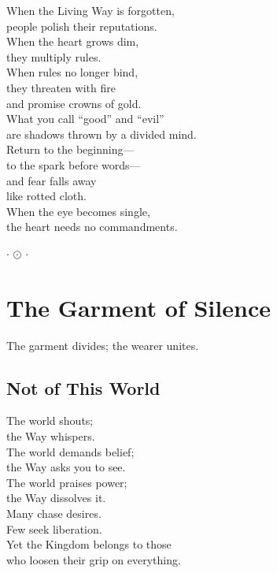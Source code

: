 \documentclass[10pt, openright]{book}
\newcommand{\sectionbreak}{\filbreak}
\newcommand{\sayingsource}[1]{\par\nopagebreak\vspace{0.3\baselineskip}{\raggedleft\footnotesize\itshape #1\par}}
\newcommand{\ornament}{
    \vspace{1.5cm}
    \begin{center}
        \large \(\cdot\) \(\odot\) \(\cdot\)
    \end{center}
    \vspace{1.5cm}
}
\begin{document}
When the Living Way is forgotten,\\
people polish their reputations.\\
When the heart grows dim,\\
they multiply rules.\\
When rules no longer bind,\\
they threaten with fire\\
and promise crowns of gold.\\
What you call ``good'' and ``evil''\\
are shadows thrown by a divided mind.\\
Return to the beginning---\\
to the spark before words---\\
and fear falls away\\
like rotted cloth.\\
When the eye becomes single,\\
the heart needs no commandments.

\sayingsource{Tao Te Ching 18--19 · Philip}

\ornament

\chapter{The Garment of Silence}\label{the-garment-of-silence}

\begin{center}
The garment divides; the wearer unites.
\end{center}

\sectionbreak

\section{Not of This World}\label{not-of-this-world}

The world shouts;\\
the Way whispers.\\
The world demands belief;\\
the Way asks you to see.\\
The world praises power;\\
the Way dissolves it.\\
Many chase desires.\\
Few seek liberation.\\
Yet the Kingdom belongs to those\\
who loosen their grip on everything.
\end{document}
